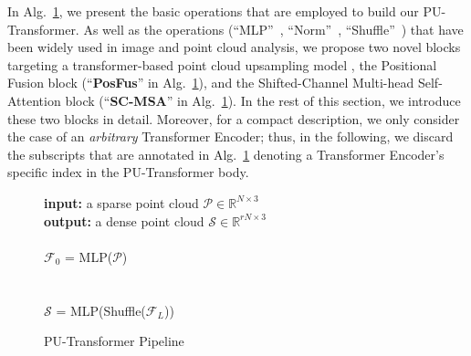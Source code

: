 In Alg.~\ref{alg:put}, we present the basic operations that are employed to build our PU-Transformer. As well as the operations (\enquote{MLP}~\cite{qi2017pointnet}, \enquote{Norm}~\cite{ba2016layer}, \enquote{Shuffle}~\cite{shi2016real}) that have been widely used in image and point cloud analysis, we propose two novel blocks targeting a transformer-based point cloud upsampling model \ie, the Positional Fusion block (\enquote{\textbf{PosFus}} in Alg.~\ref{alg:put}), and the Shifted-Channel Multi-head Self-Attention block (\enquote{\textbf{SC-MSA}} in Alg.~\ref{alg:put}). In the rest of this section, we introduce these two blocks in detail. Moreover, for a compact description, we only consider the case of an \emph{arbitrary} Transformer Encoder; thus, in the following, we discard the subscripts that are annotated in Alg.~\ref{alg:put} denoting a Transformer Encoder's specific index in the PU-Transformer body.
\noindent
\begin{figure}[t]
\begin{minipage}[t]{0.65\textwidth}
    \vspace{0pt}
    \footnotesize
    \begin{algorithm}[H]
    \caption{PU-Transformer Pipeline}\label{alg:put}
    \nonl\textbf{input:} a sparse point cloud $\mathcal{P}\in\mathbb{R}^{N\times3}$\\
    \nonl\textbf{output:} a dense point cloud $\mathcal{S}\in\mathbb{R}^{rN\times3}$\\
    {}\\
    $\mathcal{F}_0$ = MLP($\mathcal{P}$)\\
    {}\\
    {}\\
    $\mathcal{S}$ = MLP\big(Shuffle($\mathcal{F}_L$)\big)
    \end{algorithm}
\end{minipage}
\end{figure}
